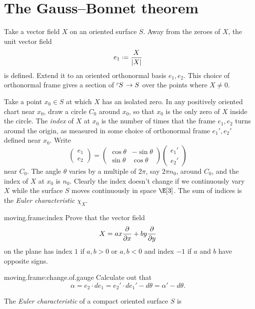 \section{The Gauss--Bonnet theorem}\label{section:Gauss.Bonnet.moving.frame}
Take a vector field \(X\) on an oriented surface \(S\).
Away from the zeroes of \(X\), the unit vector field 
\[
e_1\defeq\frac{X}{\norm{X}}
\]
is defined.
Extend it to an oriented orthonormal basis \(e_1, e_2\).
This choice of orthonormal frame gives a section of \(\left\ulcorner\!S\right. \to S\) over the points where \(X \ne 0\).

Take a point \(x_0 \in S\)  at which \(X\) has an isolated zero.
In any positively oriented chart near \(x_0\), draw a circle \(C_0\) around \(x_0\), so that \(x_0\) is the only zero of \(X\) inside the circle.
The \emph{index} of \(X\) at \(x_0\) is the number of times that the frame \(e_1, e_2\) turns around the origin, as measured in some choice of orthonormal frame \(e_1', e_2'\) defined near \(x_0\).
Write
\[
\begin{pmatrix}
e_1 \\
e_2
\end{pmatrix}
=
\begin{pmatrix}
\cos \theta & -\sin \theta \\
\sin \theta & \cos \theta
\end{pmatrix}
\begin{pmatrix}
e_1' \\
e_2'
\end{pmatrix}
\]
near \(C_0\).
The angle \(\theta\) varies by a multiple of \(2\pi\), say \(2 \pi n_0\), around \(C_0\), and the index of \(X\) at \(x_0\) is \(n_0\).
Clearly the index doesn't change if we continuously vary \(X\) while the surface \(S\) moves continuously in space \(\E[3]\). 
The sum of indices is the \emph{Euler characteristic} \(\chi_X\).
\begin{problem}{moving.frame:index}
Prove that the vector field 
\[
X= a x \pderiv{}{x} + b y \pderiv{}{y}
\]
on the plane has index \(1\) if \(a,b > 0\) or \(a,b < 0\) and index \(-1\) if \(a\) and \(b\) have opposite signs.
\end{problem}
\begin{problem}{moving.frame:change.of.gauge}
Calculate out that
\[
\alpha=e_2 \cdot de_1 = e_2' \cdot de_1' - d \theta=\alpha'-d\theta.
\]
\end{problem}
The \emph{Euler characteristic} of a compact oriented surface \(S\) is 
